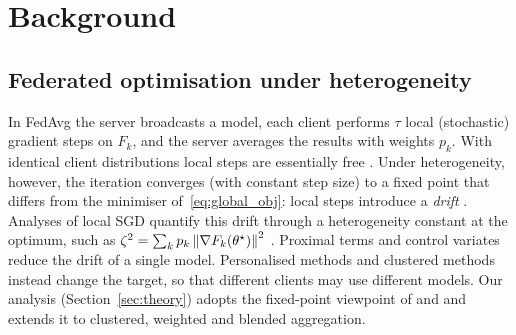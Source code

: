 \section{Background}
\label{sec:background}

\subsection{Federated optimisation under heterogeneity}
\label{sec:bg_fl}
In FedAvg \citep{mcmahan2017communication} the server broadcasts a model, each client
performs $\tau$ local (stochastic) gradient steps on $F_k$, and the server averages the
results with weights $p_k$. With identical client distributions local steps are
essentially free \citep{stich2019local,woodworth2020minibatch}. Under heterogeneity,
however, the iteration converges (with constant step size) to a fixed point that differs from
the minimiser of~\eqref{eq:global_obj}: local steps introduce a \emph{drift}
\citep{zhao2018federated,malinovsky2020local,charles2021convergence,pathak2020fedsplit}.
Analyses of local SGD quantify this drift through a heterogeneity constant at the optimum,
such as $\zeta^2=\sum_k p_k\left\lVert \nabla F_k(\theta^\star) \right\rVert^2$
\citep{khaled2020tighter,koloskova2020unified,woodworth2020minibatch}. Proximal terms
\citep[FedProx;][]{li2020federated} and control variates
\citep[SCAFFOLD;][]{karimireddy2020scaffold} reduce the drift of a single model.
Personalised methods
\citep[pFedMe, Ditto, APFL;][]{t2020personalized,li2021ditto,deng2020adaptive,hanzely2020federated}
and clustered methods \citep{ghosh2020efficient,sattler2020clustered,long2023multi} instead
change the target, so that different clients may use different models. Our analysis
(Section~\ref{sec:theory}) adopts the fixed-point viewpoint of
\citet{malinovsky2020local} and \citet{charles2021convergence} and extends it to clustered,
weighted and blended aggregation.


